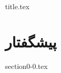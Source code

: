 \documentclass{book}
\begin{document}
\frontmatter
{title.tex}

\clearpage
\thispagestyle{empty}

\tableofcontents

\mainmatter

\renewcommand{\baselinestretch}{1.75}\normalsize

\chapter*{پیشگفتار}
{section0-0.tex}


\end{document}
